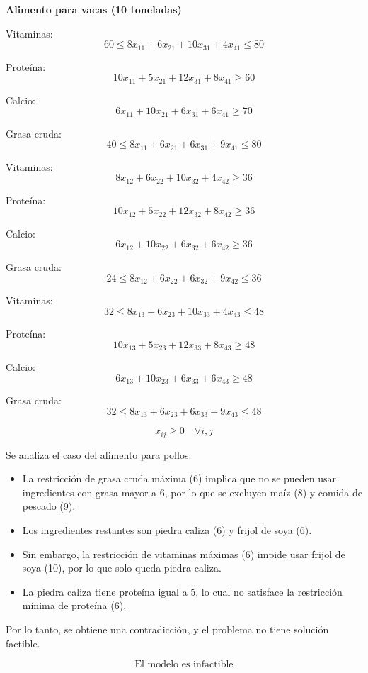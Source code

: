 \begin{Ejem}
\begin{tcolorbox}[title=Restricciones nutricionales]
\textbf{Alimento para vacas (10 toneladas)}

Vitaminas:
\[
60 \leq 8x_{11}+6x_{21}+10x_{31}+4x_{41} \leq 80
\]

Prote\'ina:
\[
10x_{11}+5x_{21}+12x_{31}+8x_{41} \geq 60
\]

Calcio:
\[
6x_{11}+10x_{21}+6x_{31}+6x_{41} \geq 70
\]

Grasa cruda:
\[
40 \leq 8x_{11}+6x_{21}+6x_{31}+9x_{41} \leq 80
\]
\end{tcolorbox}

\begin{tcolorbox}[title=Alimento para ovejas (6 toneladas)]
Vitaminas:
\[
8x_{12}+6x_{22}+10x_{32}+4x_{42} \geq 36
\]

Prote\'ina:
\[
10x_{12}+5x_{22}+12x_{32}+8x_{42} \geq 36
\]

Calcio:
\[
6x_{12}+10x_{22}+6x_{32}+6x_{42} \geq 36
\]

Grasa cruda:
\[
24 \leq 8x_{12}+6x_{22}+6x_{32}+9x_{42} \leq 36
\]
\end{tcolorbox}

\begin{tcolorbox}[title=Alimento para pollos (8 toneladas)]
Vitaminas:
\[
32 \leq 8x_{13}+6x_{23}+10x_{33}+4x_{43} \leq 48
\]

Prote\'ina:
\[
10x_{13}+5x_{23}+12x_{33}+8x_{43} \geq 48
\]

Calcio:
\[
6x_{13}+10x_{23}+6x_{33}+6x_{43} \geq 48
\]

Grasa cruda:
\[
32 \leq 8x_{13}+6x_{23}+6x_{33}+9x_{43} \leq 48
\]


\[
x_{ij} \geq 0 \quad \forall i,j
\]
\end{tcolorbox}
\medskip

\begin{tcolorbox}[title=An\'alisis de factibilidad]
Se analiza el caso del alimento para pollos:

\begin{itemize}
    \item La restricci\'on de grasa cruda m\'axima (6) implica que no se pueden usar ingredientes con grasa mayor a 6, por lo que se excluyen ma\'iz (8) y comida de pescado (9).
    
    \item Los ingredientes restantes son piedra caliza (6) y frijol de soya (6).
    
    \item Sin embargo, la restricci\'on de vitaminas m\'aximas (6) impide usar frijol de soya (10), por lo que solo queda piedra caliza.
    
    \item La piedra caliza tiene prote\'ina igual a 5, lo cual no satisface la restricci\'on m\'inima de prote\'ina (6).
\end{itemize}
\end{tcolorbox}

Por lo tanto, se obtiene una contradicci\'on, y el problema no tiene soluci\'on factible.

\[\boxed{\text{El modelo es infactible}}\]
\end{Ejem}


